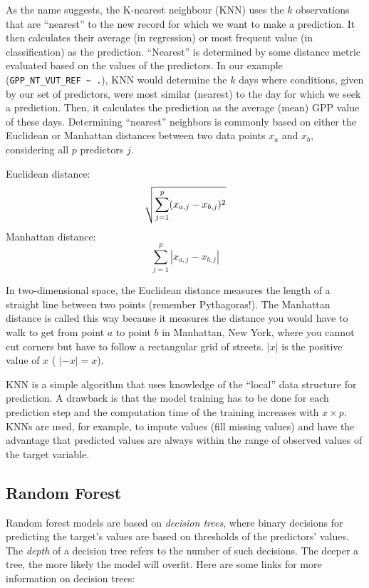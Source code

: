 \documentclass[
]{book}
\begin{document}
As the name suggests, the K-nearest neighbour (KNN) uses the \(k\) observations that are ``nearest'' to the new record for which we want to make a prediction. It then calculates their average (in regression) or most frequent value (in classification) as the prediction. ``Nearest'' is determined by some distance metric evaluated based on the values of the predictors. In our example (\texttt{GPP\_NT\_VUT\_REF\ \textasciitilde{}\ .}), KNN would determine the \(k\) days where conditions, given by our set of predictors, were most similar (nearest) to the day for which we seek a prediction. Then, it calculates the prediction as the average (mean) GPP value of these days. Determining ``nearest'' neighbors is commonly based on either the Euclidean or Manhattan distances between two data points \(x_a\) and \(x_b\), considering all \(p\) predictors \(j\).

Euclidean distance:
\[
\sqrt{ \sum_{j=1}^p (x_{a,j} - x_{b,j})^2  } \\
\]
Manhattan distance:
\[
\sum_{j=1}^p | x_{a,j} - x_{b,j} |
\]

In two-dimensional space, the Euclidean distance measures the length of a straight line between two points (remember Pythagoras!). The Manhattan distance is called this way because it measures the distance you would have to walk to get from point \(a\) to point \(b\) in Manhattan, New York, where you cannot cut corners but have to follow a rectangular grid of streets. \(|x|\) is the positive value of \(x\) ( \(|-x| = x\)).

KNN is a simple algorithm that uses knowledge of the ``local'' data structure for prediction. A drawback is that the model training has to be done for each prediction step and the computation time of the training increases with \(x \times p\). KNNs are used, for example, to impute values (fill missing values) and have the advantage that predicted values are always within the range of observed values of the target variable.

\hypertarget{random-forest}{%
\subsection{Random Forest}\label{random-forest}}

Random forest models are based on \emph{decision trees}, where binary decisions for predicting the target's values are based on thresholds of the predictors' values. The \emph{depth} of a decision tree refers to the number of such decisions. The deeper a tree, the more likely the model will overfit. Here are some links for more information on decision trees:
\end{document}
